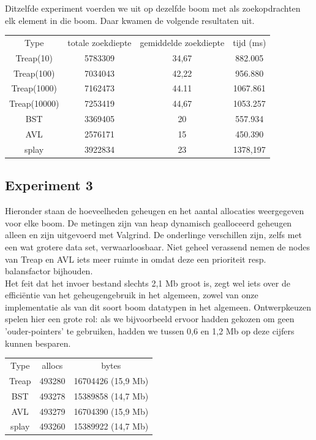\documentclass[a4paper,10pt]{article}
\begin{document}
Ditzelfde experiment voerden we uit op dezelfde boom met als zoekopdrachten elk element in die boom. Daar kwamen de volgende resultaten uit. \\

\begin{center}
\begin{tabular}{c c c c}
Type & totale zoekdiepte & gemiddelde zoekdiepte & tijd (ms) \\
Treap(10) & 5783309 & 34,67 & 882.005 \\
Treap(100) & 7034043 & 42,22 & 956.880 \\
Treap(1000) & 7162473 & 44.11 & 1067.861 \\
Treap(10000) & 7253419 & 44,67 & 1053.257 \\
BST & 3369405 & 20 & 557.934 \\
AVL & 2576171 & 15 & 450.390 \\
splay & 3922834 & 23 & 1378,197  \\
\end{tabular}
\end{center}

\subsection{Experiment 3}
Hieronder staan de hoeveelheden geheugen en het aantal allocaties weergegeven voor elke boom. De metingen zijn van heap dynamisch gealloceerd geheugen alleen en zijn uitgevoerd met Valgrind. De onderlinge verschillen zijn, zelfs met een wat grotere data set, verwaarloosbaar. Niet geheel verassend nemen de nodes van Treap en AVL iets meer ruimte in omdat deze een prioriteit resp. balansfactor bijhouden.\\
Het feit dat het invoer bestand slechts 2,1 Mb groot is, zegt wel iets over de effici\"entie van het geheugengebruik in het algemeen,
zowel van onze implementatie als van dit soort boom datatypen in het algemeen. Ontwerpkeuzen spelen hier een grote rol: als we bijvoorbeeld ervoor hadden gekozen om geen 'ouder-pointers' te gebruiken, hadden we tussen 0,6 en 1,2 Mb op deze cijfers kunnen besparen. 

\begin{center}
\begin{tabular}{c c c}
Type & allocs & bytes \\
Treap & 493280 & 16704426 (15,9 Mb) \\
BST & 493278 & 15389858 (14,7 Mb) \\
AVL & 493279 & 16704390 (15,9 Mb)\\
splay & 493260 & 15389922 (14,7 Mb)\\
\end{tabular}
\end{center}
\end{document}
